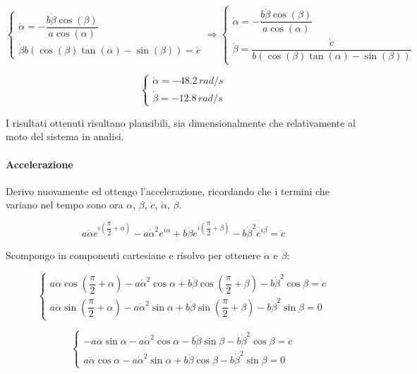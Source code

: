 \documentclass[main.tex]{subfiles}
\begin{document}
\[
\begin{cases}
	\dot{\alpha} = -\dfrac{b\dot{\beta}\cos\left (\beta \right )}{a\cos\left (\alpha \right ) } \\
	\dot{\beta}b\left (\cos\left (\beta \right )\tan\left (\alpha \right ) - \sin\left (\beta \right )\right ) = \dot{c}
\end{cases}
\Longrightarrow
\begin{cases}
	\dot{\alpha} = -\dfrac{b\dot{\beta}\cos\left (\beta \right )}{a\cos\left (\alpha \right ) } \\
	\dot{\beta} = \dfrac{\dot{c}}{b\left (\cos\left (\beta \right )\tan\left (\alpha \right ) - \sin\left (\beta \right )\right )}
\end{cases}
\]

\[
\begin{cases}
	\dot{\alpha} = -48.2\,rad/s \\
	\dot{\beta} = -12.8\,rad/s
\end{cases}
\]

I risultati ottenuti risultano plausibili, sia dimensionalmente che relativamente al moto del sistema in analisi.

\paragraph{Accelerazione}
Derivo nuovamente ed ottengo l'accelerazione, ricordando che i termini che variano nel tempo sono ora $\alpha$, $\beta$, $\dot{c}$, $\dot{\alpha}$, $\dot{\beta}$.

\[
	a\ddot{\alpha}e^{i\left (\dfrac{\pi}{2} + \alpha \right )} - a\dot{\alpha}^2e^{i\alpha} + b\ddot{\beta}e^{i\left (\dfrac{\pi}{2} + \beta \right )} -  b\dot{\beta}^2e^{i\beta} = \ddot{c}
\]

Scompongo in componenti cartesiane e risolvo per ottenere $\ddot{\alpha}$ e $\ddot{\beta}$:

\[
	\begin{cases}
		a\ddot{\alpha}\cos{\left (\dfrac{\pi}{2} + \alpha \right )} - a\dot{\alpha}^2\cos{\alpha} + b\ddot{\beta}\cos{\left (\dfrac{\pi}{2} + \beta \right )} -  b\dot{\beta}^2\cos{\beta} = \ddot{c} \\
		a\ddot{\alpha}\sin{\left (\dfrac{\pi}{2} + \alpha \right )} - a\dot{\alpha}^2\sin{\alpha} + b\ddot{\beta}\sin{\left (\dfrac{\pi}{2} + \beta \right )} -  b\dot{\beta}^2\sin{\beta} = 0
	\end{cases}
\]

\[
	\begin{cases}
		-a\ddot{\alpha}\sin{\alpha} - a\dot{\alpha}^2\cos{\alpha} - b\ddot{\beta}\sin{\beta} -  b\dot{\beta}^2\cos{\beta} = \ddot{c} \\
		a\ddot{\alpha}\cos{\alpha} - a\dot{\alpha}^2\sin{\alpha} + b\ddot{\beta}\cos{\beta} -  b\dot{\beta}^2\sin{\beta} = 0
	\end{cases}
\]
\end{document}
